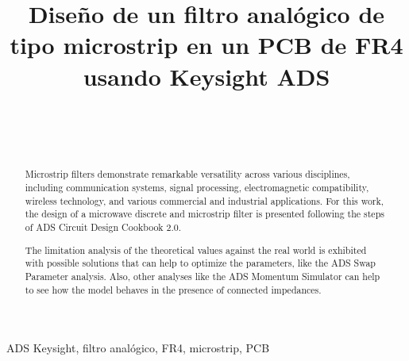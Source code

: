 \documentclass[conference]{IEEEtran}
\begin{document}
\title{Diseño de un filtro analógico de tipo microstrip en un PCB de FR4 usando Keysight ADS \\
}

\author{ \\
\and
{} \\
}

\maketitle

\begin{abstract}
Microstrip filters demonstrate remarkable versatility across various disciplines, including communication systems, signal processing, electromagnetic compatibility, wireless technology, and various commercial and industrial applications. For this work, the design of a microwave discrete and microstrip filter is presented following the steps of ADS Circuit Design Cookbook 2.0.

The limitation analysis of the theoretical values against the real world is exhibited with possible solutions that can help to optimize the parameters, like the ADS Swap Parameter analysis. Also, other analyses like the ADS Momentum Simulator can help to see how the model behaves in the presence of connected impedances.
\end{abstract}

\begin{IEEEkeywords}
ADS Keysight, filtro analógico, FR4, microstrip, PCB
\end{IEEEkeywords}










\end{document}
